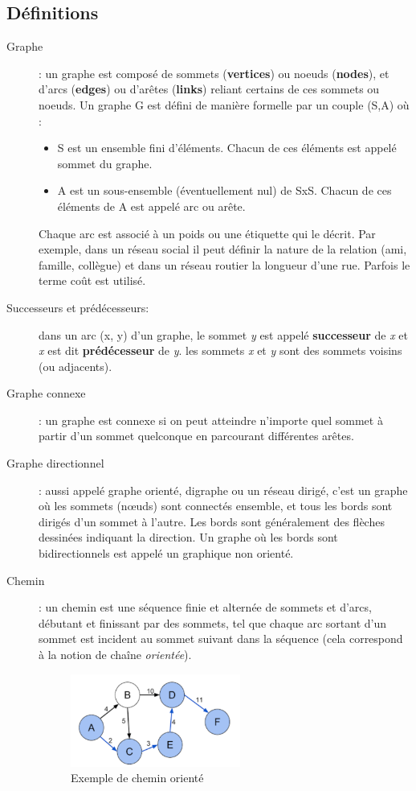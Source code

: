 \subsection{Définitions}
\begin{description}
\item[Graphe]: un graphe est composé de sommets (\textbf{vertices}) ou noeuds (\textbf{nodes}), et d'arcs (\textbf{edges}) ou d'arêtes (\textbf{links}) reliant certains de ces sommets ou noeuds.
Un graphe G est défini de manière formelle par un couple (S,A) où :
\begin{itemize}
	\item S est un ensemble fini d'éléments. Chacun de ces éléments est appelé sommet du graphe.
	\item A est un sous-ensemble (éventuellement nul) de SxS. Chacun de ces éléments de A est appelé arc ou arête.
\end{itemize}
Chaque arc est associé à un poids ou une étiquette qui le décrit. Par exemple, dans un réseau social il peut définir la nature de la relation (ami, famille, collègue) et dans un réseau routier la longueur d'une rue. Parfois le terme coût est utilisé.

\item[Successeurs et prédécesseurs:] dans un arc (x, y) d'un graphe, le sommet \emph{y} est appelé \textbf{successeur} de \emph{x} et \emph{x} est dit \textbf{prédécesseur} de \emph{y}.\newline
les sommets \emph{x} et \emph{y} sont des sommets voisins (ou adjacents).

\item[Graphe connexe] : un graphe est connexe si on peut atteindre n'importe quel sommet à partir d'un sommet quelconque en parcourant différentes arêtes.

\item[Graphe directionnel] : aussi appelé graphe orienté, digraphe ou un réseau dirigé, c'est un graphe où les sommets (nœuds) sont connectés ensemble, et tous les bords sont dirigés d'un sommet à l'autre. Les bords sont généralement des flèches dessinées indiquant la direction.
Un graphe où les bords sont bidirectionnels est appelé un graphique non orienté.

\item[Chemin] : un chemin est une séquence finie et alternée de sommets et d'arcs, débutant et finissant par des sommets, tel que chaque arc sortant d'un sommet est incident au sommet suivant dans la séquence (cela correspond à la notion de chaîne \emph{orientée}).
\begin{figure}[h]
	\centering
	\includegraphics[width=0.55\textwidth]{img/cheminGraphe.png}
	\caption{Exemple de chemin orienté}
\end{figure}
\end{description}

